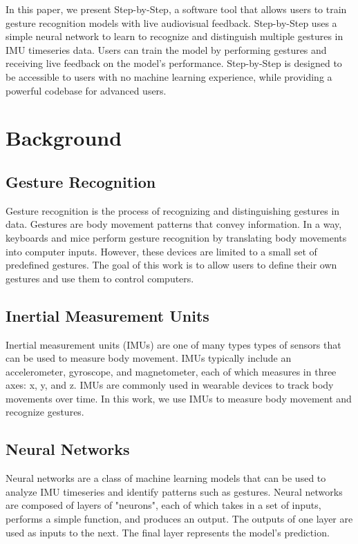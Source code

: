 \documentclass{article}
\begin{document}
In this paper, we present Step-by-Step, a software tool that allows users to train gesture recognition models with live audiovisual feedback. Step-by-Step uses a simple neural network to learn to recognize and distinguish multiple gestures in IMU timeseries data. Users can train the model by performing gestures and receiving live feedback on the model's performance. Step-by-Step is designed to be accessible to users with no machine learning experience, while providing a powerful codebase for advanced users.



\section{Background}
\subsection{Gesture Recognition}
Gesture recognition is the process of recognizing and distinguishing gestures in data. Gestures are body movement patterns that convey information. In a way, keyboards and mice perform gesture recognition by translating body movements into computer inputs. However, these devices are limited to a small set of predefined gestures. The goal of this work is to allow users to define their own gestures and use them to control computers.




\subsection{Inertial Measurement Units}
Inertial measurement units (IMUs) are one of many types types of sensors that can be used to measure body movement. IMUs typically include an accelerometer, gyroscope, and magnetometer, each of which measures in three axes: x, y, and z. IMUs are commonly used in wearable devices to track body movements over time. In this work, we use IMUs to measure body movement and recognize gestures.

\subsection{Neural Networks}
Neural networks are a class of machine learning models that can be used to analyze IMU timeseries and identify patterns such as gestures. Neural networks are composed of layers of "neurons", each of which takes in a set of inputs, performs a simple function, and produces an output. The outputs of one layer are used as inputs to the next. The final layer represents the model's prediction.
\end{document}
